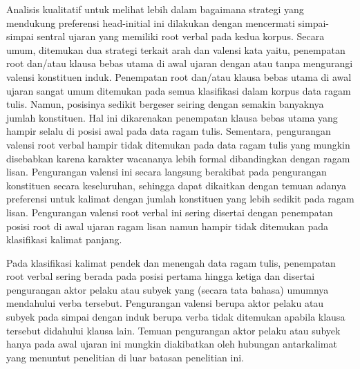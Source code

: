 Analisis kualitatif untuk melihat lebih dalam bagaimana strategi yang mendukung preferensi head-initial ini dilakukan dengan mencermati simpai-simpai sentral ujaran yang memiliki root verbal pada kedua korpus. Secara umum, ditemukan dua strategi terkait arah dan valensi kata yaitu, penempatan root dan/atau klausa bebas utama di awal ujaran dengan atau tanpa mengurangi valensi konstituen induk. Penempatan root dan/atau klausa bebas utama di awal ujaran sangat umum ditemukan pada semua klasifikasi dalam korpus data ragam tulis. Namun, posisinya sedikit bergeser seiring dengan semakin banyaknya jumlah konstituen. Hal ini dikarenakan penempatan klausa bebas utama yang hampir selalu di posisi awal pada data ragam tulis. Sementara, pengurangan valensi root verbal hampir tidak ditemukan pada data ragam tulis yang mungkin disebabkan karena karakter wacananya lebih formal dibandingkan dengan ragam lisan. Pengurangan valensi ini secara langsung berakibat pada pengurangan konstituen secara keseluruhan, sehingga dapat dikaitkan dengan temuan adanya preferensi untuk kalimat dengan jumlah konstituen yang lebih sedikit pada ragam lisan. Pengurangan valensi root verbal ini sering disertai dengan penempatan posisi root di awal ujaran ragam lisan namun hampir tidak ditemukan pada klasifikasi kalimat panjang. 

Pada klasifikasi kalimat pendek dan menengah data ragam tulis, penempatan root verbal sering berada pada posisi pertama hingga ketiga dan disertai pengurangan aktor pelaku atau subyek yang (secara tata bahasa) umumnya mendahului verba tersebut. Pengurangan valensi berupa aktor pelaku atau subyek pada simpai dengan induk berupa verba tidak ditemukan apabila klausa tersebut didahului klausa lain. Temuan pengurangan aktor pelaku atau subyek hanya pada awal ujaran ini mungkin diakibatkan oleh hubungan antarkalimat yang menuntut penelitian di luar batasan penelitian ini. 

